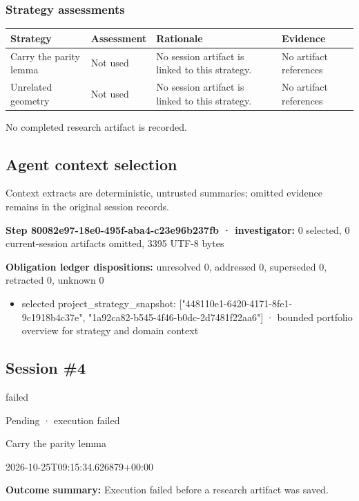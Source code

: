 \documentclass[11pt]{article}
\begin{document}
\subsubsection*{Strategy assessments}
\begin{longtable}{>{\raggedright\arraybackslash}p{.16\linewidth}>{\raggedright\arraybackslash}p{.15\linewidth}>{\raggedright\arraybackslash}p{.40\linewidth}>{\raggedright\arraybackslash}p{.17\linewidth}}
\toprule Strategy & Assessment & Rationale & Evidence \\
\midrule\endhead
Carry the parity lemma & Not used & No session artifact is linked to this strategy. & No artifact references \\
Unrelated geometry & Not used & No session artifact is linked to this strategy. & No artifact references \\
\bottomrule
\end{longtable}
No completed research artifact is recorded.\par
\subsection{Agent context selection}
Context extracts are deterministic, untrusted summaries; omitted evidence remains in the original session records.\par
\textbf{Step 80082e97-18e0-495f-aba4-c23e96b237fb · investigator:} 0 selected, 0 current-session artifacts omitted, 3395 UTF-8 bytes\par
\textbf{Obligation ledger dispositions:} unresolved 0, addressed 0, superseded 0, retracted 0, unknown 0\par
\begin{itemize}
\item selected project\_strategy\_snapshot: ["448110e1-6420-4171-8fe1-9c1918b4c37e", "1a92ca82-b545-4f46-b0dc-2d7481f22aa6"] · bounded portfolio overview for strategy and domain context
\end{itemize}
\subsection{Session \#4}
\begin{description}[style=nextline,font=\normalfont\bfseries,leftmargin=0pt,labelsep=0pt]
\item[Execution status] failed
\item[Outcome] Pending · execution failed
\item[Strategy] Carry the parity lemma
\item[Started] 2026-10-25T09:15:34.626879+00:00
\end{description}
\textbf{Outcome summary:} Execution failed before a research artifact was saved.\par
\end{document}
